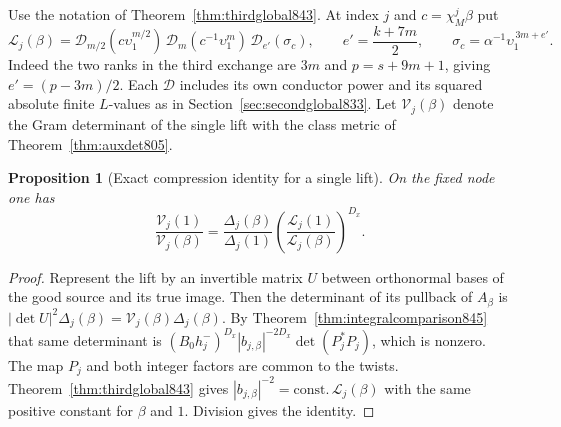 \documentclass[a4paper,11pt]{article}
\newtheorem{proposition}{Proposition}[section]
\theoremstyle{definition}
\theoremstyle{remark}
\numberwithin{equation}{section}
\begin{document}
Use the notation of Theorem~\ref{thm:thirdglobal843}. At index
\(j\) and \(c=\chi_M^j\beta\) put
\[
  \mathcal L_j(\beta)=
    \mathcal D_{m/2}(c\upsilon_1^{m/2})\,
    \mathcal D_m(c^{-1}\upsilon_1^m)\,
    \mathcal D_{e'}(\sigma_c),\qquad
       e'=\frac{k+7m}{2},\qquad
       \sigma_c=\alpha^{-1}\upsilon_1^{\,3m+e'} .
\]
Indeed the two ranks in the third exchange are \(3m\) and
\(p=s+9m+1\), giving \(e'=(p-3m)/2\). Each \(\mathcal D\)
includes its own conductor power and its squared absolute finite
\(L\)-values as in Section~\ref{sec:secondglobal833}.
Let \(\mathcal V_j(\beta)\) denote the Gram determinant of the
single lift with the class metric of Theorem~\ref{thm:auxdet805}.

\begin{proposition}[Exact compression identity for a single lift]
\leavevmode\label{prop:compressionidentity851}
On the fixed node one has
\[
 \frac{\mathcal V_j(1)}{\mathcal V_j(\beta)}
   =\frac{\Delta_j(\beta)}{\Delta_j(1)}
        \left(\frac{\mathcal L_j(1)}{\mathcal L_j(\beta)}\right)^{D_x}.
\]
\end{proposition}
\begin{proof}
Represent the lift by an invertible matrix \(U\) between
orthonormal bases of the good source and its true image.
Then the determinant of its pullback of \(A_\beta\) is
\(|\det U|^2\Delta_j(\beta)=\mathcal V_j(\beta)\Delta_j(\beta)\).
By Theorem~\ref{thm:integralcomparison845} that same determinant
is \((B_0h_j^-)^{D_x}|b_{j,\beta}|^{-2D_x}\det(P_j^*P_j)\),
which is nonzero. The map \(P_j\) and both integer factors are
common to the twists. Theorem~\ref{thm:thirdglobal843} gives
\(|b_{j,\beta}|^{-2}=\text{const.}\,\mathcal L_j(\beta)\)
with the same positive constant for \(\beta\) and \(1\). Division
gives the identity.
\end{proof}
\end{document}
